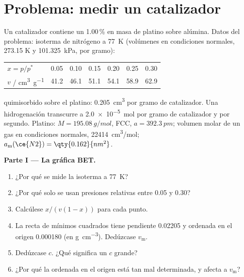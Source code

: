 \section{Problema: medir un catalizador}

\begin{problem}
\label{pb:b3:surfaces-catalysis:1}
Un catalizador contiene un 1.00\,\% en masa de platino sobre alúmina. Datos del problema:
isoterma de nitrógeno a \qty{77}{K} (volúmenes en condiciones normales, 273.15 K y
\qty{101.325}{kPa}, por gramo):
\begin{center}\small
\begin{tabular}{lcccccc}
\hline
$x = p/p^*$ & 0.05 & 0.10 & 0.15 & 0.20 & 0.25 & 0.30 \\
$v$ / \unit{cm^3.g^{-1}} & 41.2 & 46.1 & 51.1 & 54.1 & 58.9 & 62.9 \\ \hline
\end{tabular}
\end{center}
 quimisorbido sobre el platino: \qty{0.205}{cm^3} por gramo de catalizador. Una hidrogenación
transcurre a \qty{2.0e-5}{mol} por gramo de catalizador y por segundo. Platino: $M = \qty{195.08}{g/mol}$, FCC,
$a = \qty{392.3}{pm}$; volumen molar de un gas en condiciones normales, \qty{22414}{cm^3/mol};
$a_{\mathrm m}(\ce{N2}) = \qty{0.162}{nm^2}$.

\medskip\noindent\textbf{Parte I --- La gráfica BET.}
\begin{enumerate}
  \item ¿Por qué se mide la isoterma a \qty{77}{K}?
  \item ¿Por qué solo se usan presiones relativas entre 0.05 y 0.30?
  \item Calcúlese $x/(v(1 - x))$ para cada punto.
  \item La recta de mínimos cuadrados tiene pendiente \num{0.02205} y ordenada en el origen \num{0.000180} (en
        \unit{g.cm^{-3}}). Dedúzcase $v_{\mathrm m}$.
  \item Dedúzcase $c$. ¿Qué significa un $c$ grande?
  \item ¿Por qué la ordenada en el origen está tan mal determinada, y afecta a $v_{\mathrm m}$?
\end{enumerate}


\end{problem}

